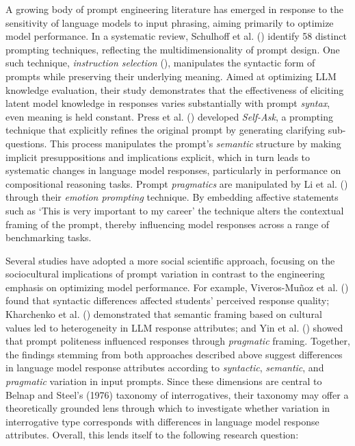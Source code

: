 \documentclass[
  12pt,
]{article}
\begin{document}
A growing body of prompt engineering literature has emerged in response to the sensitivity of language models to input phrasing, aiming primarily to optimize model performance. In a systematic review, Schulhoff et al. () identify 58 distinct prompting techniques, reflecting the multidimensionality of prompt design. One such technique, \emph{instruction selection} (), manipulates the syntactic form of prompts while preserving their underlying meaning. Aimed at optimizing LLM knowledge evaluation, their study demonstrates that the effectiveness of eliciting latent model knowledge in responses varies substantially with prompt \emph{syntax}, even meaning is held constant. Press et al. () developed \emph{Self-Ask}, a prompting technique that explicitly refines the original prompt by generating clarifying sub-questions. This process manipulates the prompt's \emph{semantic} structure by making implicit presuppositions and implications explicit, which in turn leads to systematic changes in language model responses, particularly in performance on compositional reasoning tasks. Prompt \emph{pragmatics} are manipulated by Li et al. () through their \emph{emotion prompting} technique. By embedding affective statements such as `This is very important to my career' the technique alters the contextual framing of the prompt, thereby influencing model responses across a range of benchmarking tasks.

Several studies have adopted a more social scientific approach, focusing on the sociocultural implications of prompt variation in contrast to the engineering emphasis on optimizing model performance. For example, Viveros-Muñoz et al. () found that syntactic differences affected students' perceived response quality; Kharchenko et al. () demonstrated that semantic framing based on cultural values led to heterogeneity in LLM response attributes; and Yin et al. () showed that prompt politeness influenced responses through \emph{pragmatic} framing. Together, the findings stemming from both approaches described above suggest differences in language model response attributes according to \emph{syntactic}, \emph{semantic}, and \emph{pragmatic} variation in input prompts. Since these dimensions are central to Belnap and Steel's (1976) taxonomy of interrogatives, their taxonomy may offer a theoretically grounded lens through which to investigate whether variation in interrogative type corresponds with differences in language model response attributes. Overall, this lends itself to the following research question:
\end{document}
